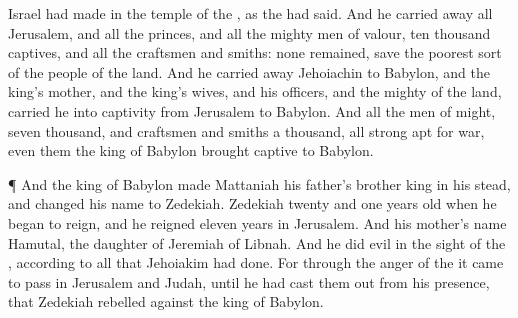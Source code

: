 {Israel had
made in the
temple of the
{}, as the
{} had
said.
And he carried
away all
Jerusalem, and all the
princes, and all the mighty
men of
valour,
{}
ten
thousand
captives, and all the
craftsmen and
smiths: none
remained,
save the poorest
sort of the
people of the
land.
And he carried
away
Jehoiachin to
Babylon, and the
king’s
mother, and the
king’s
wives, and his
officers, and the
mighty of the
land,
{}
carried he into
captivity from
Jerusalem to
Babylon.
And all the
men of
might,
{}
seven
thousand, and
craftsmen and
smiths a
thousand, all
{}
strong
{}
apt for
war, even them the
king of
Babylon
brought
captive to
Babylon.
\par }{\PP {}¶ And the
king of
Babylon made
Mattaniah his
father’s brother
king in his stead, and
changed his
name to
Zedekiah.
Zedekiah
{}
twenty and
one
years
old when he began to
reign, and he
reigned
eleven
years in
Jerusalem. And his
mother’s
name
{}
Hamutal, the
daughter of
Jeremiah of
Libnah.
And he
did
{}
evil in the
sight of the
{}, according to all that
Jehoiakim had
done.
For through the
anger of the
{} it came to pass in
Jerusalem and
Judah, until he had cast them
out from his
presence, that
Zedekiah
rebelled against the
king of
Babylon.

}
